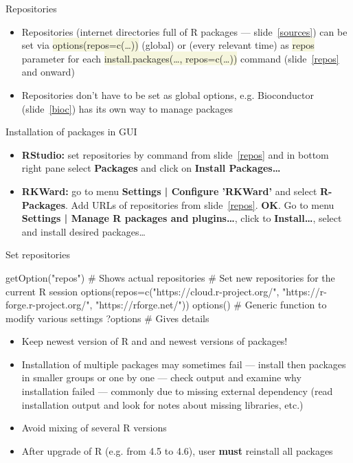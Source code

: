 \documentclass[compress, xelatex, 11pt, xcolor=svgnames, aspectratio=169, url={hyphens, lowtilde}]{beamer}
\renewcommand{\texttt}[1]{\colorbox{Beige}{{\ttfamily #1}}}
\begin{document}
\begin{frame}{Repositories}
	\begin{itemize}
		\item Repositories (internet directories full of R packages --- slide~\ref{sources}) can be set via \texttt{options(repos=c(\ldots))} (global) or (every relevant time) as \texttt{repos} parameter for each \texttt{install.packages(\ldots, repos=c(\ldots))} command (slide~\ref{repos} and onward)
		\item Repositories don't have to be set as global options, e.g. Bioconductor (slide~\ref{bioc}) has its own way to manage packages
	\end{itemize}
	\begin{block}{Installation of packages in GUI}
		\begin{itemize}
			\item \textbf{RStudio:} set repositories by command from slide~\ref{repos} and in bottom right pane select \textbf{Packages} and click on \textbf{Install Packages\ldots}
			\item \textbf{RKWard:} go to menu \textbf{Settings | Configure 'RKWard'} and select \textbf{R-Packages}. Add URLs of repositories from slide~\ref{repos}. \textbf{OK}. Go to menu \textbf{Settings | Manage R packages and plugins\ldots}, click to \textbf{Install\ldots}, select and install desired packages\ldots
		\end{itemize}
	\end{block}
\end{frame}

\begin{frame}[fragile]{Set repositories}
	\label{repos}
	\begin{spluscode}
    getOption("repos") # Shows actual repositories
    # Set new repositories for the current R session
    options(repos=c("https://cloud.r-project.org/",
      "https://r-forge.r-project.org/", "https://rforge.net/"))
    options() # Generic function to modify various settings
    ?options # Gives details
	\end{spluscode}
	\begin{itemize}
		\item \alert{Keep newest version of R and and newest versions of packages!}
		\item Installation of multiple packages may sometimes fail --- install then packages in smaller groups or one by one --- check output and examine why installation failed --- commonly due to missing external dependency (read installation output and look for notes about missing libraries, etc.)
		\item Avoid mixing of several R versions
		\item After upgrade of R (e.g. from 4.5 to 4.6), user \textbf{must} reinstall all packages
	\end{itemize}
\end{frame}
\end{document}
